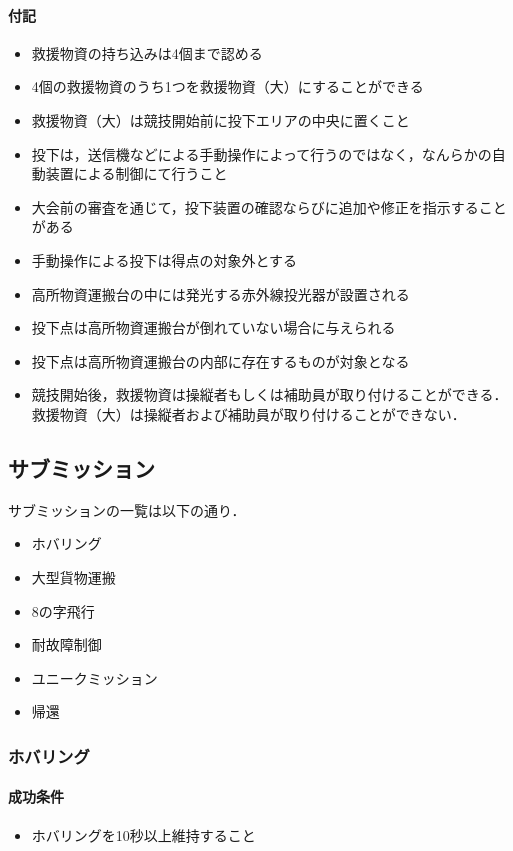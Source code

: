 \paragraph{付記}
\begin{itemize}
\item 救援物資の持ち込みは4個まで認める
\item 4個の救援物資のうち1つを救援物資（大）にすることができる
\item 救援物資（大）は競技開始前に投下エリアの中央に置くこと
\item 投下は，送信機などによる手動操作によって行うのではなく，なんらかの自動装置による制御にて行うこと
\item 大会前の審査を通じて，投下装置の確認ならびに追加や修正を指示することがある
\item 手動操作による投下は得点の対象外とする
\item 高所物資運搬台の中には発光する赤外線投光器が設置される
\item 投下点は高所物資運搬台が倒れていない場合に与えられる
\item 投下点は高所物資運搬台の内部に存在するものが対象となる
\item 競技開始後，救援物資は操縦者もしくは補助員が取り付けることができる．救援物資（大）は操縦者および補助員が取り付けることができない．
\end{itemize}

\subsection{サブミッション}
サブミッションの一覧は以下の通り．
\begin{itemize}
\item ホバリング
\item 大型貨物運搬
\item 8の字飛行
\item 耐故障制御
\item ユニークミッション
\item 帰還
\end{itemize}

\subsubsection{ホバリング}
\paragraph{成功条件}
\begin{itemize}
  \item ホバリングを10秒以上維持すること
\end{itemize}
